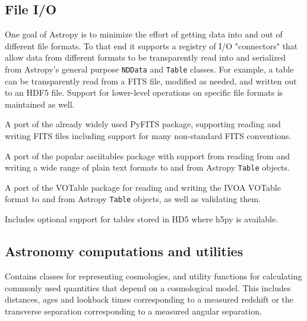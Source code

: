 \documentclass[11pt,twoside]{article}
\begin{document}
\subsection{File I/O}

One goal of Astropy is to minimize the effort of getting data into and out of
different file formats.  To that end it supports a registry of I/O "connectors"
that allow data from different formats to be transparently read into and
serialized from Astropy's general purpose \texttt{NDData} and \texttt{Table}
classes.  For example, a table can be transparently read from a FITS file,
modified as needed, and written out to an HDF5 file.  Support for lower-level
operations on specific file formats is maintained as well.


A port of the already widely used PyFITS package, supporting reading and
writing FITS files including support for many non-standard FITS conventions.


A port of the popular asciitables package with support from reading from and
writing a wide range of plain text formats to and from Astropy \texttt{Table}
objects.


A port of the VOTable package for reading and writing the IVOA VOTable format
to and from Astropy \texttt{Table} objects, as well as validating them.


Includes optional support for tables stored in HD5 where h5py is available.

\subsection{Astronomy computations and utilities}


Contains classes for representing cosmologies, and utility functions for
calculating commonly used quantities that depend on a cosmological model.  This
includes distances, ages and lookback times corresponding to a measured
redshift or the transverse separation corresponding to a measured angular
separation.

\end{document}
